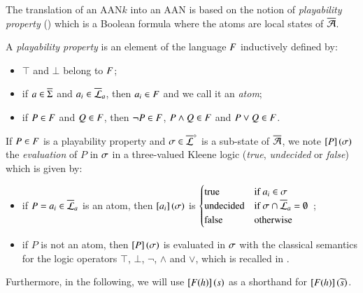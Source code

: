The translation of an AAN$k$ into an AAN
is based on the notion of \emph{playability property} ()
which is a Boolean formula where the atoms are local states of $\overline{\mathcal{A}}$.

\begin{definition}
  \label{def:pp}
  A \emph{playability property} is an element of the language $F$ inductively defined by:
  \begin{itemize}
    \item $\top$ and $\bot$ belong to $F$;
    \item if $a \in \overline{\Sigma}$ and $a_i \in \overline{\mathcal{L}}_a$, then $a_i \in F$ and we call it an \emph{atom};
    \item if $P \in F$ and $Q \in F$, then $\neg P \in F$, $P \wedge Q \in F$ and $P \vee Q \in F$.
  \end{itemize}
  If $P \in F$ is a playability property and $\sigma \in \overline{\mathcal{L}}^{\diamond}$ is a sub-state of $\overline{\mathcal{A}}$,
  we note $\left[P\right](\sigma)$ the \emph{evaluation} of $P$ in $\sigma$
  in a three-valued Kleene logic (\emph{true}, \emph{undecided} or \emph{false})
  which is given by:
  \begin{itemize}
    \item if $P = a_i \in \overline{\mathcal{L}}_a$ is an atom,
      then $\left[a_i\right](\sigma)$ is
    $\begin{cases}
       \text{true}      & \text{if } a_i \in \sigma \\
       \text{undecided} & \text{if } \sigma \cap \overline{\mathcal{L}}_a = \emptyset \\
       \text{false}     & \text{otherwise }
     \end{cases}$ \enspace;
    \item if $P$ is not an atom, then $\left[P\right](\sigma)$ is evaluated in $\sigma$
      with the classical semantics for the logic operators $\top$, $\bot$, $\neg$, $\wedge$ and $\vee$, which is recalled in .
  \end{itemize}
  Furthermore, in the following, we will use $\left[F(h)\right](s)$ as a shorthand for
  $\left[F(h)\right](\widetilde{s})$.
\end{definition}


